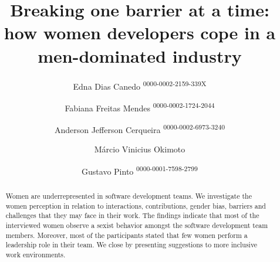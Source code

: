 \documentclass{IEEEcsmag}
\begin{document}

\title{Breaking one barrier at a time: how women developers cope in a men-dominated industry}

\newcommand{\orcidauthorEdna}{0000-0002-2159-339X} %
\newcommand{\orcidauthorFabiana}{0000-0002-1724-2044} %
\newcommand{\orcidauthorAnderson}{0000-0002-6973-3240} %
\newcommand{\orcidauthorGustavo}{0000-0001-7598-2799} %

\author{Edna Dias Canedo \textsuperscript{\orcidauthorEdna{}}}

\author{Fabiana Freitas Mendes \textsuperscript{\orcidauthorFabiana{}}}

\author{Anderson Jefferson Cerqueira \textsuperscript{\orcidauthorAnderson{}}}

\author{M\'{a}rcio Vinicius Okimoto}

\author{Gustavo Pinto \textsuperscript{\orcidauthorGustavo{}}}


\begin{abstract}
Women are underrepresented in software development teams. %
We investigate the women perception in relation to interactions, contributions, gender bias, barriers and challenges that they may face in their work. The findings indicate that most of the interviewed women observe a sexist behavior amongst the software development team members. Moreover, most of the participants stated that few women perform a leadership role in their team. We close by presenting suggestions to more inclusive work environments. 
\end{abstract}

\maketitle

\end{document}
